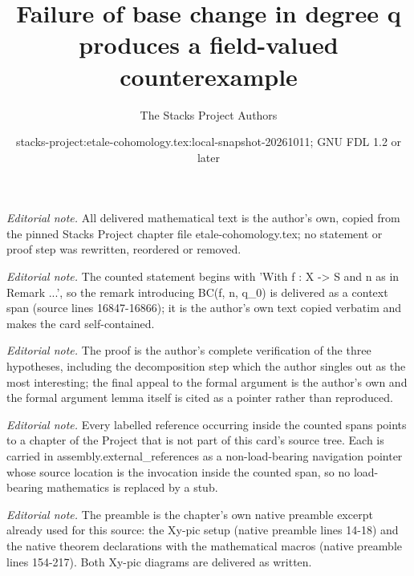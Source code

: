 \documentclass[10pt,a4paper]{amsart}
\title{Failure of base change in degree q produces a field-valued counterexample}
\author{The Stacks Project Authors}
\date{stacks-project:etale-cohomology.tex:local-snapshot-20261011; GNU FDL 1.2 or later}
\theoremstyle{plain}
\theoremstyle{definition}
\theoremstyle{remark}
\numberwithin{equation}{subsection}
\begin{document}
\maketitle
\noindent\textit{Editorial note.} All delivered mathematical text is the author's own, copied from the pinned Stacks Project chapter file etale-cohomology.tex; no statement or proof step was rewritten, reordered or removed.\par\medskip
\noindent\textit{Editorial note.} The counted statement begins with 'With f : X -> S and n as in Remark ...', so the remark introducing BC(f, n, q\_0) is delivered as a context span (source lines 16847-16866); it is the author's own text copied verbatim and makes the card self-contained.\par\medskip
\noindent\textit{Editorial note.} The proof is the author's complete verification of the three hypotheses, including the decomposition step which the author singles out as the most interesting; the final appeal to the formal argument is the author's own and the formal argument lemma itself is cited as a pointer rather than reproduced.\par\medskip
\noindent\textit{Editorial note.} Every labelled reference occurring inside the counted spans points to a chapter of the Project that is not part of this card's source tree. Each is carried in assembly.external\_references as a non-load-bearing navigation pointer whose source location is the invocation inside the counted span, so no load-bearing mathematics is replaced by a stub.\par\medskip
\noindent\textit{Editorial note.} The preamble is the chapter's own native preamble excerpt already used for this source: the Xy-pic setup (native preamble lines 14-18) and the native theorem declarations with the mathematical macros (native preamble lines 154-217). Both Xy-pic diagrams are delivered as written.\par\medskip
\end{document}
